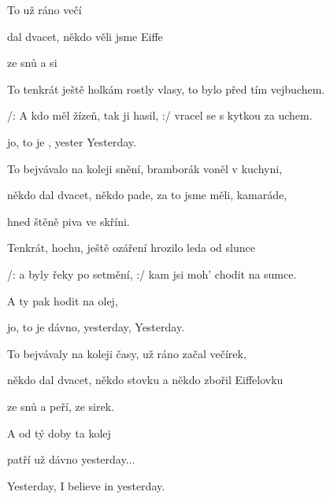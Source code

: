 

\zs
To   
už ráno  večí

 dal dvacet, někdo 
věli jsme Eiffe

ze snů a   si
\ks

\zs
To tenkrát ještě holkám rostly vlasy,
to bylo před tím vejbuchem.

/: A kdo měl žízeň, tak ji hasil, :/
vracel se s kytkou za uchem.
\ks

\zr
{}  

jo, to je , yester Yesterday.
  
\kr

\zs
To bejvávalo na koleji snění,
bramborák voněl v kuchyni,

někdo dal dvacet, někdo pade,
za to jsme měli, kamaráde,

hned štěně piva ve skříni.
\ks

\zs
Tenkrát, hochu, ještě ozáření
hrozilo leda od slunce

/: a byly řeky po setmění, :/ kam jsi moh' chodit na sumce.
\ks

\zr
A ty pak hodit na olej,

jo, to je dávno, yesterday, Yesterday.
\kr

\zs
To bejvávaly na koleji časy,
už ráno začal večírek,

někdo dal dvacet, někdo stovku
a někdo zbořil Eiffelovku

ze snů a peří, ze sirek.
\ks

\zr
A od tý doby ta kolej

patří už dávno yesterday...

Yesterday, I believe in yesterday.
\kr

\kp
